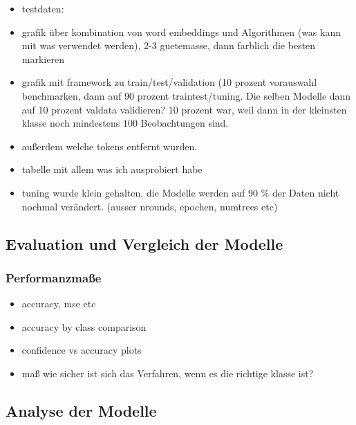 \documentclass[a4paper,11pt]{article}
\begin{document}



\begin{itemize}
\item testdaten: 
    \item grafik über kombination von word embeddings und Algorithmen (was kann mit was verwendet werden), 2-3 guetemasse, dann farblich die besten markieren
\end{itemize}{}

\begin{itemize}
    \item grafik mit framework zu train/test/validation (10 prozent vorauswahl benchmarken, dann auf 90 prozent traintest/tuning. Die selben Modelle dann auf 10 prozent valdata validieren? 10 prozent war, weil dann in der kleinsten klasse noch mindestens $100$ Beobachtungen sind.
    \item außerdem welche tokens entfernt wurden.
    \item tabelle mit allem was ich ausprobiert habe
    \item tuning wurde klein gehalten, die Modelle werden auf 90 \% der Daten nicht nochmal verändert. (ausser nrounds, epochen, numtrees etc)
\end{itemize}{}

\subsection{Evaluation und Vergleich der Modelle} \label{kap:evalFinal}
\subsubsection{Performanzmaße}

\begin{itemize}
    \item accuracy, mse etc
    \item accuracy by class comparison
    \item confidence vs accuracy plots
    \item maß wie sicher ist sich das Verfahren, wenn es die richtige klasse ist?
\end{itemize}{}

\subsection{Analyse der Modelle}
\end{document}
